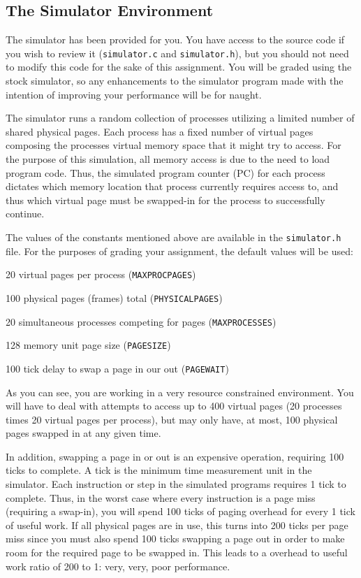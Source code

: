 \documentclass[12pt]{article}
\newenvironment{packed_item}{
\begin{itemize}
  \setlength{\itemsep}{1pt}
  \setlength{\parskip}{0pt}
  \setlength{\parsep}{0pt}
}{\end{itemize}}
\begin{document}
\subsection {The Simulator Environment}

The simulator has been provided for you. You have access to the source
code if you wish to review it (\texttt{simulator.c} and
\texttt{simulator.h}), but you
should not need to modify this code for the sake of this
assignment. You will be graded using the stock simulator, so any
enhancements to the simulator program made with the intention of
improving your performance will be for naught.

The simulator runs a random collection of processes utilizing a limited
number of shared physical pages. Each process has a fixed number of
virtual pages composing the processes virtual memory space
that it might try to access. For the purpose of this
simulation, all memory access is due to the need to load program
code. Thus, the simulated program counter (PC) for each process
dictates which memory location that process currently requires access
to, and thus which virtual page must be swapped-in for the
process to successfully continue.

The values of the constants mentioned above
are available in the \texttt{simulator.h} file. For the purposes of
grading your assignment, the default values will be used:

\begin{packed_item}
\item 20 virtual pages per process (\texttt{MAXPROCPAGES})
\item 100 physical pages (frames) total (\texttt{PHYSICALPAGES})
\item 20 simultaneous processes competing for pages (\texttt{MAXPROCESSES})
\item 128 memory unit page size (\texttt{PAGESIZE})
\item 100 tick delay to swap a page in our out (\texttt{PAGEWAIT})
\end{packed_item}

As you can see, you are working in a very resource constrained
environment. You will have to deal with attempts to access up to 400
virtual pages (20 processes times 20 virtual pages per process),
but may only have, at most, 100 physical pages swapped in at any given
time.

In addition, swapping a page
in or out is an expensive operation, requiring 100 ticks to
complete. A tick is the minimum time measurement unit in the
simulator. Each instruction or step in the simulated programs requires 1
tick to complete. Thus, in the worst case where every instruction is a
page miss (requiring a swap-in), you will spend 100 ticks of paging
overhead for every 1 tick of useful work. If all physical pages are in
use, this turns into 200 ticks per page miss since you must also
spend 100 ticks swapping a page out in order to make room for the
required page to be swapped in. This leads to a overhead to
useful work ratio of 200 to 1: very, very, poor performance.
\end{document}
